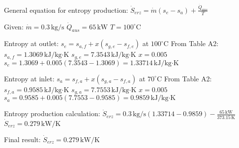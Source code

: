 General equation for entropy production:  
\( \dot{S}_{erz} = \dot{m} (s_e - s_a) + \frac{\dot{Q}_{aus}}{T} \)  

Given:  
\( \dot{m} = 0.3 \, \text{kg/s} \)  
\( \dot{Q}_{aus} = 65 \, \text{kW} \)  
\( T = 100^\circ \text{C} \)  

Entropy at outlet:  
\( s_e = s_{a,f} + x (s_{g,e} - s_{f,e}) \) at \( 100^\circ \text{C} \)  
From Table A2:  
\( s_{a,f} = 1.3069 \, \text{kJ/kg·K} \)  
\( s_{g,e} = 7.3543 \, \text{kJ/kg·K} \)  
\( x = 0.005 \)  
\( s_e = 1.3069 + 0.005 (7.3543 - 1.3069) = 1.33714 \, \text{kJ/kg·K} \)  

Entropy at inlet:  
\( s_a = s_{f,a} + x (s_{g,a} - s_{f,a}) \) at \( 70^\circ \text{C} \)  
From Table A2:  
\( s_{f,a} = 0.9585 \, \text{kJ/kg·K} \)  
\( s_{g,a} = 7.7553 \, \text{kJ/kg·K} \)  
\( x = 0.005 \)  
\( s_a = 0.9585 + 0.005 (7.7553 - 0.9585) = 0.9859 \, \text{kJ/kg·K} \)  

Entropy production calculation:  
\( \dot{S}_{erz} = 0.3 \, \text{kg/s} (1.33714 - 0.9859) - \frac{65 \, \text{kW}}{373.15 \, \text{K}} \)  
\( \dot{S}_{erz} = 0.279 \, \text{kW/K} \)  

Final result:  
\( \dot{S}_{erz} = 0.279 \, \text{kW/K} \)